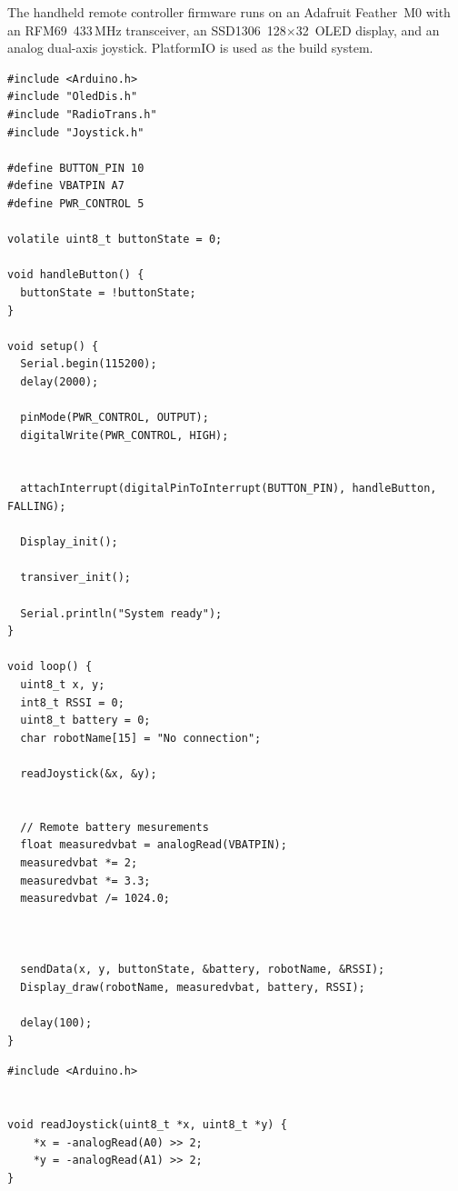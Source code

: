 The handheld remote controller firmware runs on an Adafruit Feather~M0
with an RFM69~433\,MHz transceiver, an SSD1306~128$\times$32~OLED display,
and an analog dual-axis joystick.  PlatformIO is used as the build system.

\begin{lstlisting}[style=appendix, caption={Remote --- main.cpp}, label={lst:remote-main}]
#include <Arduino.h>
#include "OledDis.h"
#include "RadioTrans.h"
#include "Joystick.h"

#define BUTTON_PIN 10
#define VBATPIN A7
#define PWR_CONTROL 5

volatile uint8_t buttonState = 0;

void handleButton() {
  buttonState = !buttonState;
}

void setup() {
  Serial.begin(115200);
  delay(2000);

  pinMode(PWR_CONTROL, OUTPUT);
  digitalWrite(PWR_CONTROL, HIGH);


  attachInterrupt(digitalPinToInterrupt(BUTTON_PIN), handleButton, FALLING);

  Display_init();

  transiver_init();   

  Serial.println("System ready");
}

void loop() {
  uint8_t x, y;
  int8_t RSSI = 0;
  uint8_t battery = 0;
  char robotName[15] = "No connection";

  readJoystick(&x, &y);


  // Remote battery mesurements
  float measuredvbat = analogRead(VBATPIN);
  measuredvbat *= 2;
  measuredvbat *= 3.3;
  measuredvbat /= 1024.0;



  sendData(x, y, buttonState, &battery, robotName, &RSSI);
  Display_draw(robotName, measuredvbat, battery, RSSI);

  delay(100);
}
\end{lstlisting}

\begin{lstlisting}[style=appendix, caption={Remote --- Joystick.cpp}, label={lst:remote-joystick}]
#include <Arduino.h>


void readJoystick(uint8_t *x, uint8_t *y) {
    *x = -analogRead(A0) >> 2;
    *y = -analogRead(A1) >> 2;
}
\end{lstlisting}

